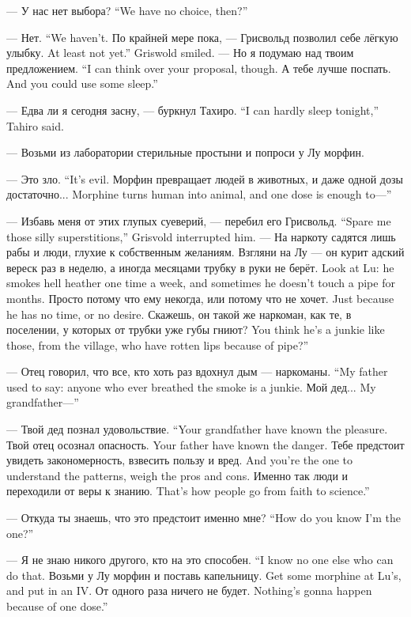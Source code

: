 {--- У нас нет выбора?}
{``We have no choice, then?''}

{--- Нет.}
{``We haven't.}
{По крайней мере пока, --- Грисвольд позволил себе лёгкую улыбку.}
{At least not yet.'' Griswold smiled.}
{--- Но я подумаю над твоим предложением.}
{``I can think over your proposal, though.}
{А тебе лучше поспать.}
{And you could use some sleep.''}

{--- Едва ли я сегодня засну, --- буркнул Тахиро.}
{``I can hardly sleep tonight,'' Tahiro said.}

--- Возьми из лаборатории стерильные простыни и попроси у Лу морфин.

{--- Это зло.}
{``It's evil.}
{Морфин превращает людей в животных, и даже одной дозы достаточно...}
{Morphine turns human into animal, and one dose is enough to---''}

{--- Избавь меня от этих глупых суеверий, --- перебил его Грисвольд.}
{``Spare me those silly superstitions,'' Grisvold interrupted him.}
--- На наркоту садятся лишь рабы и люди, глухие к собственным желаниям.
{Взгляни на Лу --- он курит адский вереск раз в неделю, а иногда месяцами трубку в руки не берёт.}
{Look at Lu: he smokes hell heather one time a week, and sometimes he doesn't touch a pipe for months.}
{Просто потому что ему некогда, или потому что не хочет.}
{Just because he has no time, or no desire.}
{Скажешь, он такой же наркоман, как те, в поселении, у которых от трубки уже губы гниют?}
{You think he's a junkie like those, from the village, who have rotten lips because of pipe?''}

{--- Отец говорил, что все, кто хоть раз вдохнул дым --- наркоманы.}
{``My father used to say: anyone who ever breathed the smoke is a junkie.}
{Мой дед...}
{My grandfather---''}

{--- Твой дед познал удовольствие.}
{``Your grandfather have known the pleasure.}
{Твой отец осознал опасность.}
{Your father have known the danger.}
{Тебе предстоит увидеть закономерность, взвесить пользу и вред.}
{And you're the one to understand the patterns, weigh the pros and cons.}
{Именно так люди и переходили от веры к знанию.}
{That's how people go from faith to science.''}

{--- Откуда ты знаешь, что это предстоит именно мне?}
{``How do you know I'm the one?''}

{--- Я не знаю никого другого, кто на это способен.}
{``I know no one else who can do that.}
{Возьми у Лу морфин и поставь капельницу.}
{Get some morphine at Lu's, and put in an IV.}
{От одного раза ничего не будет.}
{Nothing's gonna happen because of one dose.''}

